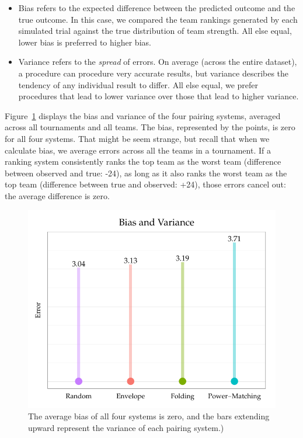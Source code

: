 \documentclass{tufte-handout}
\begin{document}
\begin{itemize}
\item Bias refers to the expected difference between the predicted outcome and the true outcome. In this case, we compared the team rankings generated by each simulated trial against the true distribution of team strength. All else equal, lower bias is preferred to higher bias. 
\item  Variance refers to the \emph{spread} of errors. On average (across the entire dataset), a procedure can procedure very accurate results, but variance describes the tendency of any individual result to differ. All else equal, we prefer procedures that lead to lower variance over those that lead to higher variance.
\end{itemize}

Figure~\ref{fig:bias_var} displays the bias and variance of the four pairing systems, averaged across all tournaments and all teams. The bias, represented by the points, is zero for all four systems. That might be seem strange, but recall that when we calculate bias, we average errors across all the teams in a tournament. If a ranking system consistently ranks the top team as the worst team (difference between observed and true: -24), as long as it also ranks the worst team as the top team (difference between true and observed: +24), those errors cancel out: the average difference is zero.  
\begin{figure}
  \includegraphics[width=0.7\linewidth]{error_bar.pdf}
  \caption{The average bias of all four systems is zero, and the bars extending upward represent the variance of each pairing system.)}
  \label{fig:bias_var}
\end{figure}
\end{document}
